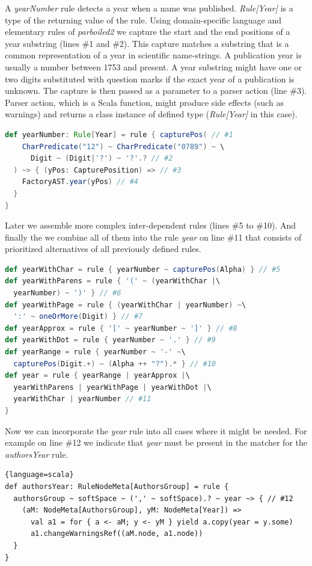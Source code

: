 \documentclass{bmcart}
\begin{document}
A \textit{yearNumber} rule detects a year when a name was published. \textit{Rule[Year]} is a type of the returning value of the rule. Using domain-specific language and elementary rules of \textit{parboiled2} we capture the start and the end positions of a year substring (lines \#1 and \#2). This capture matches a substring that is a common representation of a year in scientific name-strings. A publication year is usually a number between 1753 \cite{Linne1753} and present. A year substring might have one or two digits substituted with question marks if the exact year of a publication is unknown. The capture is then passed as a parameter to a parser action (line \#3). Parser action, which is a Scala function, might produce side effects (such as warnings) and returns a class instance of defined type (\textit{Rule[Year]} in this case).

\begin{lstlisting}[language=scala]
def yearNumber: Rule[Year] = rule { capturePos( // #1
    CharPredicate("12") ~ CharPredicate("0789") ~ \
      Digit ~ (Digit|'?') ~ '?'.? // #2
  ) ~> { (yPos: CapturePosition) => // #3
    FactoryAST.year(yPos) // #4
  }
}
\end{lstlisting}

Later we assemble more complex inter-dependent rules (lines \#5 to \#10). And finally the we combine all of them into the rule \textit{year} on line \#11 that consists of prioritized alternatives of all previously defined rules.

\begin{lstlisting}[language=scala]
def yearWithChar = rule { yearNumber ~ capturePos(Alpha) } // #5
def yearWithParens = rule { '(' ~ (yearWithChar |\
  yearNumber) ~ ')' } // #6
def yearWithPage = rule { (yearWithChar | yearNumber) ~\
  ':' ~ oneOrMore(Digit) } // #7
def yearApprox = rule { '[' ~ yearNumber ~ ']' } // #8
def yearWithDot = rule { yearNumber ~ '.' } // #9
def yearRange = rule { yearNumber ~ '-' ~\
  capturePos(Digit.+) ~ (Alpha ++ "?").* } // #10
def year = rule { yearRange | yearApprox |\
  yearWithParens | yearWithPage | yearWithDot |\
  yearWithChar | yearNumber // #11
}
\end{lstlisting}

Now we can incorporate the \textit{year} rule into all cases where it might be needed. For example on line \#12 we indicate that \textit{year} must be present in the matcher for the \textit{authorsYear} rule.

\begin{lstlisting}{language=scala}
def authorsYear: RuleNodeMeta[AuthorsGroup] = rule {
  authorsGroup ~ softSpace ~ (',' ~ softSpace).? ~ year ~> { // #12
    (aM: NodeMeta[AuthorsGroup], yM: NodeMeta[Year]) =>
      val a1 = for { a <- aM; y <- yM } yield a.copy(year = y.some)
      a1.changeWarningsRef((aM.node, a1.node))
  }
}
\end{lstlisting}
\end{document}

